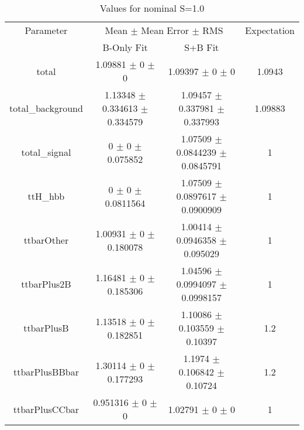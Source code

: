 \begin{table}
\centering
\caption{Values for nominal S=1.0}
\begin{tabular}{cccc}
\toprule
Parameter & \multicolumn{2}{c}{Mean $\pm$ Mean Error $\pm$ RMS} & Expectation\\
 & B-Only Fit & S+B Fit & \\
\midrule
total & \num{1.09881} $\pm$ \num{0} $\pm$ \num{0} & \num{1.09397} $\pm$ \num{0} $\pm$ \num{0} & \num{1.0943}\\
total\_background & \num{1.13348} $\pm$ \num{0.334613} $\pm$ \num{0.334579} & \num{1.09457} $\pm$ \num{0.337981} $\pm$ \num{0.337993} & \num{1.09883}\\
total\_signal & \num{0} $\pm$ \num{0} $\pm$ \num{0.075852} & \num{1.07509} $\pm$ \num{0.0844239} $\pm$ \num{0.0845791} & \num{1}\\
ttH\_hbb & \num{0} $\pm$ \num{0} $\pm$ \num{0.0811564} & \num{1.07509} $\pm$ \num{0.0897617} $\pm$ \num{0.0900909} & \num{1}\\
ttbarOther & \num{1.00931} $\pm$ \num{0} $\pm$ \num{0.180078} & \num{1.00414} $\pm$ \num{0.0946358} $\pm$ \num{0.095029} & \num{1}\\
ttbarPlus2B & \num{1.16481} $\pm$ \num{0} $\pm$ \num{0.185306} & \num{1.04596} $\pm$ \num{0.0994097} $\pm$ \num{0.0998157} & \num{1}\\
ttbarPlusB & \num{1.13518} $\pm$ \num{0} $\pm$ \num{0.182851} & \num{1.10086} $\pm$ \num{0.103559} $\pm$ \num{0.10397} & \num{1.2}\\
ttbarPlusBBbar & \num{1.30114} $\pm$ \num{0} $\pm$ \num{0.177293} & \num{1.1974} $\pm$ \num{0.106842} $\pm$ \num{0.10724} & \num{1.2}\\
ttbarPlusCCbar & \num{0.951316} $\pm$ \num{0} $\pm$ \num{0} & \num{1.02791} $\pm$ \num{0} $\pm$ \num{0} & \num{1}\\
\bottomrule
\end{tabular}
\end{table}